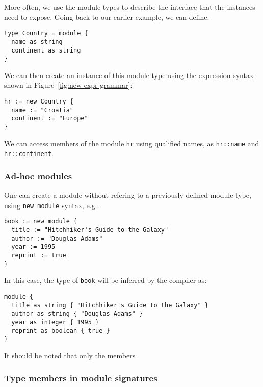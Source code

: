 \documentclass[droidmono,libertine,twoside,user,unofficial]{ecarticle}
\newcommand{\optSemiCol}{\begin{stack}\\`;'\end{stack}}
\begin{document}
More often, we use the module types to describe the interface that the
instances need to expose.
Going back to our earlier example, we can
define:
\begin{lstlisting}
type Country = module {
  name as string
  continent as string
}
\end{lstlisting}
We can then create an instance of this module type using the
expression syntax shown in Figure~\ref{fig:new-expr-grammar}:
\begin{lstlisting}
hr := new Country {
  name := "Croatia"
  continent := "Europe"
}
\end{lstlisting}

We can access members of the module \texttt{hr} using qualified names,
as \texttt{hr::name} and \texttt{hr::continent}.

\subsubsection*{Ad-hoc modules}

One can create a module without refering to a previously defined
module type, using \texttt{new module} syntax, e.g.:
\begin{lstlisting}
book := new module {
  title := "Hitchhiker's Guide to the Galaxy"
  author := "Douglas Adams"
  year := 1995
  reprint := true
}
\end{lstlisting}

In this case, the type of \texttt{book} will be inferred by the
compiler as:
\begin{lstlisting}
module {
  title as string { "Hitchhiker's Guide to the Galaxy" }
  author as string { "Douglas Adams" }
  year as integer { 1995 }
  reprint as boolean { true }
}
\end{lstlisting}

It should be noted that only the members 

\subsubsection*{Type members in module signatures}
\end{document}
